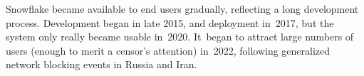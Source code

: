 \documentclass[letterpaper,twocolumn]{article}
\begin{document}

Snowflake became available to end users gradually,
reflecting a long development process.
Development began in late 2015,
and deployment in~2017,
but the system only really became usable in~2020.
It~began to attract large numbers of users
(enough to merit a censor's attention)
in~2022, following generalized
network blocking events in Russia and Iran.
\end{document}
